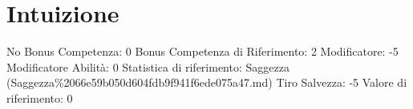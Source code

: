 \section{Intuizione}\label{intuizione}

\begin{description}
\tightlist
\item[Tags: ABI]
No Bonus Competenza: 0 Bonus Competenza di Riferimento: 2 Modificatore:
-5 Modificatore Abilità: 0 Statistica di riferimento: Saggezza
(Saggezza\%2066e59b050d604fdb9f941f6ede075a47.md) Tiro Salvezza: -5
Valore di riferimento: 0
\end{description}
